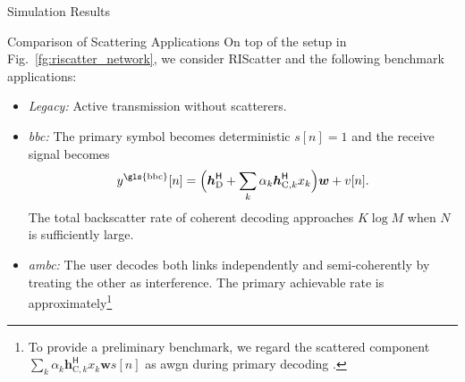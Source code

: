 \documentclass[journal]{IEEEtran}
\begin{document}
\begin{section}{Simulation Results}
	\begin{subsection}{Comparison of Scattering Applications}
		On top of the setup in Fig.~\ref{fg:riscatter_network}, we consider RIScatter and the following benchmark applications:
		\begin{itemize}
			\item \emph{Legacy:} Active transmission without scatterers.
			\item \emph{\gls{bbc}:} The primary symbol becomes deterministic $s[n]=1$ and the receive signal becomes
			\begin{equation}
				y^{\text{\gls{bbc}}}[n] = \Bigl(\boldsymbol{h}_{\text{D}}^\mathsf{H} + \sum_{k} \alpha_k \boldsymbol{h}_{\text{C},k}^\mathsf{H} x_k\Bigr) \boldsymbol{w} + v[n].
			\end{equation}
			The total backscatter rate of coherent decoding approaches $K \log M$ when $N$ is sufficiently large.
			\item \emph{\gls{ambc}:} The user decodes both links independently and semi-coherently by treating the other as interference.
			The primary achievable rate is approximately\footnote{To provide a preliminary benchmark, we regard the scattered component $\sum_{k} \alpha_k \boldsymbol{h}_{\text{C},k}^\mathsf{H} x_k \boldsymbol{w}s[n]$ as \gls{awgn} during primary decoding \cite{Long2020a}.}

\end{itemize}
\end{subsection}
\end{section}
\end{document}
